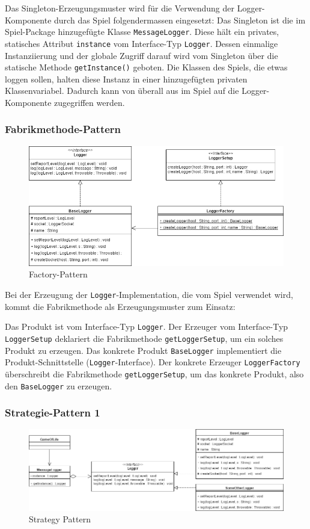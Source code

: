 \documentclass[12pt,a4paper,twosided]{scrartcl}
\begin{document}
Das Singleton-Erzeugungsmuster wird für die Verwendung der Logger-Komponente durch das Spiel folgendermassen eingesetzt:
Das Singleton ist die im Spiel-Package hinzugefügte Klasse \texttt{MessageLogger}. Diese hält ein privates, statisches Attribut \texttt{instance} vom Interface-Typ \texttt{Logger}. Dessen einmalige Instanziierung und der globale Zugriff darauf wird vom Singleton über die statische Methode \texttt{getInstance()} geboten. Die Klassen des Spiels, die etwas loggen
sollen, halten diese Instanz in einer hinzugefügten privaten Klassenvariabel. Dadurch kann von überall aus im Spiel auf die Logger-Komponente zugegriffen werden.


\subsubsection{Fabrikmethode-Pattern}
\begin{figure}[h]
	\centering
	\includegraphics[width=0.7\linewidth]{img/FactoryPattern}
	\caption{Factory-Pattern}
	\label{fig:factorypattern}
\end{figure}

Bei der Erzeugung der \texttt{Logger}-Implementation, die vom Spiel verwendet wird, kommt die Fabrikmethode als Erzeugungsmuster zum Einsatz:

Das Produkt ist vom Interface-Typ \texttt{Logger}. Der Erzeuger vom Interface-Typ \texttt{LoggerSetup} deklariert die Fabrikmethode \texttt{getLoggerSetup}, um ein solches Produkt zu erzeugen. Das konkrete Produkt \texttt{BaseLogger} implementiert die Produkt-Schnittstelle (\texttt{Logger}-Interface).
Der konkrete Erzeuger \texttt{LoggerFactory} überschreibt die Fabrikmethode \texttt{getLoggerSetup}, um das konkrete Produkt, also den \texttt{BaseLogger}
zu erzeugen.

\subsubsection{Strategie-Pattern 1}
\begin{figure}[h]
	\centering
	\includegraphics[width=0.7\linewidth]{img/StrategyPattern}
	\caption{Strategy Pattern}
	\label{fig:strategypattern}
\end{figure}
\end{document}
